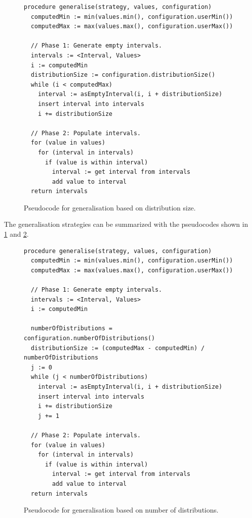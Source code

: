 \documentclass[a4paper,twoside,12pt]{book}
\begin{document}
\begin{figure}[h]
\begin{verbatim}
procedure generalise(strategy, values, configuration)
  computedMin := min(values.min(), configuration.userMin())
  computedMax := max(values.max(), configuration.userMax())

  // Phase 1: Generate empty intervals.
  intervals := <Interval, Values>
  i := computedMin
  distributionSize := configuration.distributionSize()
  while (i < computedMax)
    interval := asEmptyInterval(i, i + distributionSize)
    insert interval into intervals
    i += distributionSize

  // Phase 2: Populate intervals.
  for (value in values)
    for (interval in intervals)
      if (value is within interval)
        interval := get interval from intervals
        add value to interval
  return intervals
\end{verbatim}
\caption{Pseudocode for generalisation based on distribution size.}
\label{fig:code:generalisation1}
\end{figure}

The generalisation strategies can be summarized with the pseudocodes shown in \ref{fig:code:generalisation1} and \ref{fig:code:generalisation2}.


\begin{figure}[h]
\begin{verbatim}
procedure generalise(strategy, values, configuration)
  computedMin := min(values.min(), configuration.userMin())
  computedMax := max(values.max(), configuration.userMax())

  // Phase 1: Generate empty intervals.
  intervals := <Interval, Values>
  i := computedMin
  
  numberOfDistributions = configuration.numberOfDistributions()
  distributionSize := (computedMax - computedMin) / numberOfDistributions
  j := 0    
  while (j < numberOfDistributions)
    interval := asEmptyInterval(i, i + distributionSize)
    insert interval into intervals
    i += distributionSize
    j += 1

  // Phase 2: Populate intervals.
  for (value in values)
    for (interval in intervals)
      if (value is within interval)
        interval := get interval from intervals
        add value to interval
  return intervals
\end{verbatim}
\caption{Pseudocode for generalisation based on number of distributions.}
\label{fig:code:generalisation2}
\end{figure}
\end{document}
